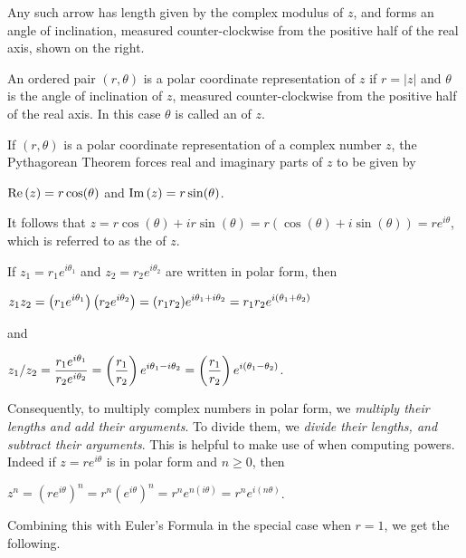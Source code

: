 \documentclass[11pt,fleqn,dvipsnames,usenames]{article}
\newcommand{\p}{\noindent}
\begin{document}
\p Any such arrow has length given by the complex modulus of $z$, and forms an angle of inclination, measured counter-clockwise from the positive half of the real axis, shown on the right.

\begin{definition}
An ordered pair $(r,\theta)$ is a polar coordinate representation of $z$ if $r = |z|$ and $\theta$ is the angle of inclination of $z$, measured counter-clockwise from the positive half of the real axis.  In this case $\theta$ is called an  of $z$.
\end{definition}

\note If $(r,\theta)$ is a polar coordinate representation of a complex number $z$, the Pythagorean Theorem forces real and imaginary parts of $z$ to be given by
\begin{center}
$\text{Re}\left(z\right) = r\cos(\theta)$ and $\text{Im}\left(z\right) = r\sin(\theta)$.
\end{center}
It follows that $z = r\cos(\theta) + ir\sin(\theta) = r(\cos(\theta) + i\sin(\theta)) = re^{i\theta}$, which is referred to as the  of $z$.
\vsp

\observation If $z_{1} = r_{1}e^{i\theta_{1}}$ and $z_{2} = r_{2}e^{i\theta_{2}}$ are written in polar form, then
\begin{center}
$\displaystyle{z_{1}z_{2} = \left(r_{1}e^{i\theta_{1}}\right)\left(r_{2}e^{i\theta_{2}}\right) = (r_{1}r_{2})e^{i\theta_{1} + i\theta_{2}} = r_{1}r_{2}e^{i(\theta_{1} +\theta_{2})}}$
\end{center}
and
\begin{center}
$\displaystyle{z_{1}/z_{2} = \frac{r_{1}e^{i\theta_{1}}}{r_{2}e^{i\theta_{2}}} = \left(\frac{r_{1}}{r_{2}}\right)e^{i\theta_{1} - i\theta_{2}} = \left(\frac{r_{1}}{r_{2}}\right)e^{i(\theta_{1} - \theta_{2})}}$.
\end{center}
\vsp

\p Consequently, to multiply complex numbers in polar form, we \emph{multiply their lengths and add their arguments}.  To divide them, we \emph{divide their lengths, and subtract their arguments}.  This is helpful to make use of when computing powers.  Indeed if $z = re^{i\theta}$ is in polar form and $n\geq 0$, then
\begin{center}
$z^{n} = \left(re^{i\theta}\right)^{n} = r^{n}\left(e^{i\theta}\right)^{n} = r^{n}e^{n(i\theta)} = r^{n}e^{i(n\theta)}$.
\end{center}
\vsp

\p Combining this with Euler's Formula in the special case when $r = 1$, we get the following.
\vsp
\end{document}
